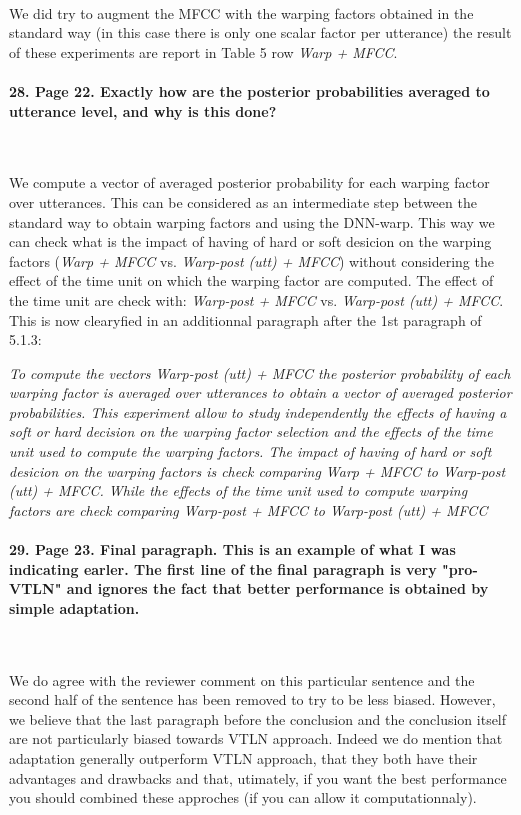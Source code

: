\documentclass[]{article}
\begin{document}
~

We did try to augment the MFCC with the warping factors obtained in the standard way (in this case there is only one scalar factor per utterance) the result of these experiments are report in Table 5 row {\em Warp + MFCC}.

\paragraph{28. Page 22. Exactly how are the posterior probabilities averaged to utterance level, and why is this done?}

~

We compute a vector of averaged posterior probability for each warping factor over utterances. This can be considered as an intermediate step between the standard way to obtain warping factors and using the DNN-warp. This way we can check what is the impact of having of hard or soft desicion on the warping factors ({\em Warp + MFCC} vs. {\em Warp-post (utt) + MFCC}) without considering the effect of the time unit on which the warping factor are computed. The effect of the time unit are check with: {\em Warp-post + MFCC} vs. {\em Warp-post (utt) + MFCC}. This is now clearyfied in an additionnal paragraph after the 1st paragraph of 5.1.3:

\textit{To compute the vectors {\em Warp-post (utt) + MFCC} the posterior probability of each warping factor is averaged over utterances to obtain a vector of averaged posterior probabilities. This experiment allow to study independently the effects of having a soft or hard decision on the warping factor selection and the effects of the time unit used to compute the warping factors. The impact of having of hard or soft desicion on the warping factors is check comparing {\em Warp + MFCC} to {\em Warp-post (utt) + MFCC}. While the effects of the time unit used to compute warping factors are check comparing {\em Warp-post + MFCC} to {\em Warp-post (utt) + MFCC}}


\paragraph{29. Page 23. Final paragraph. This is an example of what I was indicating earler. The first line of the final paragraph is very "pro-VTLN" and ignores the fact that better performance is obtained by simple adaptation.}

~

We do agree with the reviewer comment on this particular sentence and the second half of the sentence has been removed to try to be less biased. However, we believe that the last paragraph before the conclusion and the conclusion itself are not particularly biased towards VTLN approach. Indeed we do mention that adaptation generally outperform VTLN approach, that they both have their advantages and drawbacks and that, utimately, if you want the best performance you should combined these approches (if you can allow it computationnaly).
\end{document}
